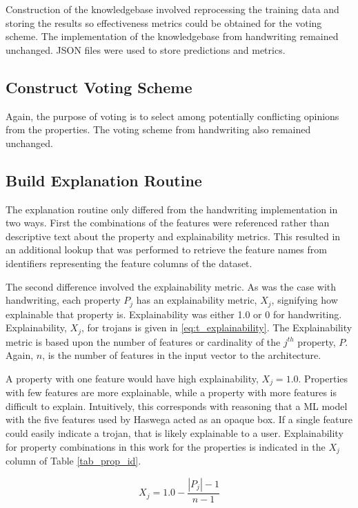 Construction of the knowledgebase involved reprocessing the training data and
storing the results so effectiveness metrics could be obtained for the voting
scheme.  The implementation of the knowledgebase from handwriting remained
unchanged.  JSON files were used to store predictions and metrics. 

\subsection{Construct Voting Scheme}

Again, the purpose of voting is to select among potentially conflicting opinions
from the properties. The voting scheme from handwriting also remained unchanged.

\subsection{Build Explanation Routine}

The explanation routine only differed from the handwriting implementation in two
ways. First the combinations of the features were referenced rather than
descriptive text about the property and explainability metrics.  This resulted
in an additional lookup that was performed to retrieve the feature names from
identifiers representing the feature columns of the dataset.

The second difference involved the explainability metric.  As was the case with
handwriting, each property $P_j$ has an explainability metric, $X_j$, signifying
how explainable that property is.  Explainability was either 1.0 or 0 for
handwriting. Explainability, $X_j$, for trojans is given in \eqref{eq:t_explainability}. The
Explainability metric is based upon the number of features or cardinality of the
$j^{th}$ property, $P$.  Again, $n$, is the number of features in the input
vector to the architecture.

A property with one feature would have high explainability, $X_j=1.0$.
Properties with few features are more explainable, while a property with more
features is difficult to explain.  Intuitively, this corresponds with reasoning
that a ML model with the five features used by Haswega acted as an opaque box.
If a single feature could easily indicate a trojan, that is likely explainable
to a user.  Explainability for property combinations in this work for the
properties is indicated in the $X_j$ column of Table \ref{tab_prop_id}.

\begin{equation}\label{eq:t_explainability}
    X_j = 1.0 - \frac{|P_j| - 1}{n - 1}
\end{equation}

